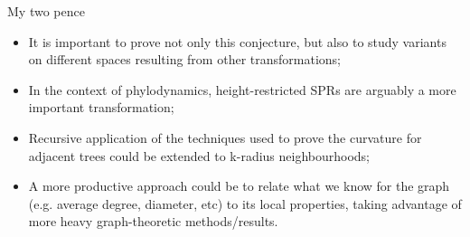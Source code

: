 \begin{frame}{My two pence}
 \begin{itemize}
  \item It is important to prove not only this conjecture, but also to study variants on different spaces resulting from other transformations;
  \item In the context of phylodynamics, height-restricted SPRs are arguably a more important transformation;
  \item Recursive application of the techniques used to prove the curvature for adjacent trees could be extended to k-radius neighbourhoods;
  \item A more productive approach could be to relate what we know for the graph (e.g. average degree, diameter, etc) to its local properties, taking advantage of more heavy graph-theoretic methods/results.
 \end{itemize}
\end{frame}
